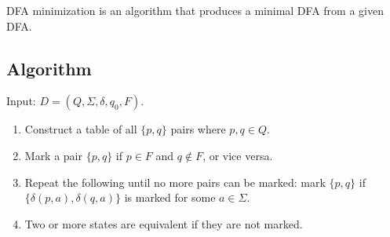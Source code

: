 DFA minimization is an algorithm that produces a minimal DFA from a given DFA.

\subsection*{Algorithm}

Input: $D = (Q, \Sigma, \delta, q_0, F)$.

\begin{enumerate}[1.]
    \item Construct a table of all $\{p, q\}$ pairs where $p, q \in Q$.
    \item Mark a pair $\{p, q\}$ if $p \in F$ and $q \notin F$, or vice versa.
    \item Repeat the following until no more pairs can be marked: mark $\{p,q\}$ if $\{\delta(p,a), \delta(q,a)\}$ is marked for some $a \in \Sigma$.
    \item Two or more states are equivalent if they are not marked.
\end{enumerate}

